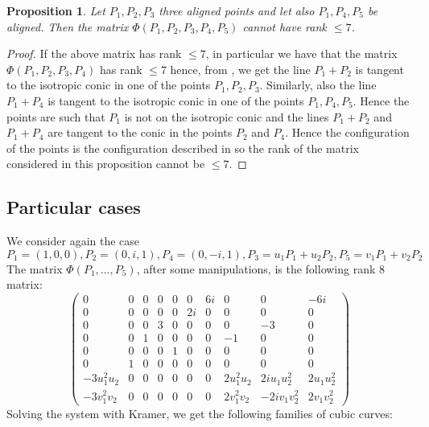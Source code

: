 \documentclass[12pt, a4paper, reqno, captions=tableheading,bibliography=totoc]{scrartcl}
\theoremstyle{plain}
\newtheorem{prop}[lemma]{Proposition}
\theoremstyle{definition}
\newcommand{\imunit}{i}
\begin{document}
\begin{prop}
  Let $P_1, P_2, P_3$ three aligned points and let also $P_1, P_4, P_5$
  be aligned. Then the matrix $\Phi(P_1, P_2, P_3, P_4, P_5)$ cannot
  have rank $\leq 7$.
\end{prop}
\begin{proof}
  If the above matrix has rank $\leq 7$, in particular we have that
  the matrix $\Phi(P_1, P_2, P_3, P_4)$ has rank $\leq 7$ hence, from
  , we get the line $P_1+P_2$ is
  tangent to the isotropic conic in one of the points $P_1, P_2, P_3$.
  Similarly, also the line $P_1+P_4$ is tangent to the isotropic conic
  in one of the points $P_1, P_4, P_5$. Hence the points are such that
  $P_1$ is not on the isotropic conic and the lines $P_1+P_2$ and
  $P_1+P_4$ are tangent to the conic in the points $P_2$ and $P_4$.
  Hence the configuration of the points is the configuration described
  in  so the rank of the matrix
  considered in this proposition cannot be $\leq 7$.
\end{proof}

\subsection{Particular cases}

We consider again the case
\[
P_1 = (1, 0, 0), P_2 = (0, i, 1), P_4 = (0, -i, 1), P_3 = u_1P_1+u_2P_2,
P_5 = v_1P_1+v_2P_2
\]
The matrix $\Phi(P_1, \dotsc, P_5)$,
after some manipulations, is the following rank 8 matrix:
\[
\left(\begin{array}{rrrrrrrrrr}
0 & 0 & 0 & 0 & 0 & 0 & 6 \imunit & 0 & 0 & -6 \imunit \\
0 & 0 & 0 & 0 & 0 & 2 \imunit & 0 & 0 & 0 & 0 \\
0 & 0 & 0 & 3 & 0 & 0 & 0 & 0 & -3 & 0 \\
0 & 0 & 1 & 0 & 0 & 0 & 0 & -1 & 0 & 0 \\
0 & 0 & 0 & 0 & 1 & 0 & 0 & 0 & 0 & 0 \\
0 & 1 & 0 & 0 & 0 & 0 & 0 & 0 & 0 & 0 \\
-3 u_{1}^{2} u_{2} & 0 & 0 & 0 & 0 & 0 & 0 & 2 u_{1}^{2} u_{2} & 2 \imunit u_{1} u_{2}^{2} & 2 u_{1} u_{2}^{2} \\
-3 v_{1}^{2} v_{2} & 0 & 0 & 0 & 0 & 0 & 0 & 2 v_{1}^{2} v_{2} & -2 \imunit v_{1} v_{2}^{2} & 2 v_{1} v_{2}^{2}
\end{array}\right)
\]
Solving the system with Kramer, we get the following families of
cubic curves:
\end{document}

